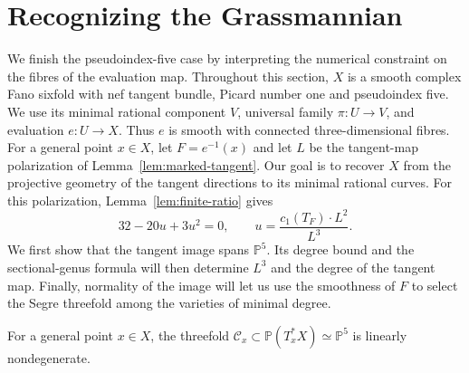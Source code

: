 \section{Recognizing the Grassmannian}\label{sec:grassmannian}

We finish the pseudoindex-five case by interpreting the numerical constraint
on the fibres of the evaluation map.  Throughout this section, $X$ is a
smooth complex Fano sixfold with nef tangent bundle, Picard number one and
pseudoindex five.  We use its minimal rational component $V$, universal
family $\pi\colon U\to V$, and evaluation $e\colon U\to X$.
Thus $e$ is smooth with connected three-dimensional fibres. For a general
point $x\in X$, let $F=e^{-1}(x)$ and let $L$ be the tangent-map
polarization of Lemma~\ref{lem:marked-tangent}.
Our goal is to recover $X$ from the projective geometry of the tangent
directions to its minimal rational curves.
For this polarization, Lemma~\ref{lem:finite-ratio} gives
\begin{equation}\label{eq:vmrt-ratio-input}
 32-20u+3u^2=0,
 \qquad u=\frac{c_1(T_F)\cdot L^2}{L^3}.
\end{equation}
We first show that the tangent image spans $\mathbb P^5$. Its degree
bound and the sectional-genus formula will then determine $L^3$ and
the degree of the tangent map. Finally, normality of the image will
let us use the smoothness of $F$ to select the Segre threefold among
the varieties of minimal degree.

\begin{lemma}\label{lem:vmrt-nondegenerate}
For a general point $x\in X$, the threefold
$\mathcal C_x\subset\mathbb P(T_x^*X)\simeq\mathbb P^5$ is linearly
nondegenerate.
\end{lemma}

